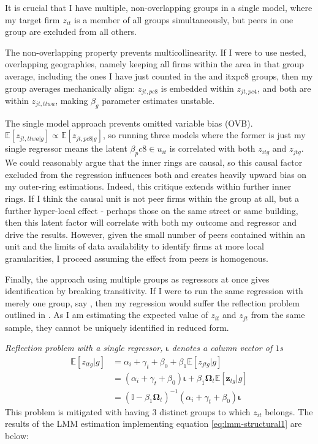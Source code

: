 It is crucial that I have multiple, non-overlapping groups in a single model,
where my target firm $z_{it}$ is a member of all groups simultaneously,
but peers in one group are excluded from all others.
\par
The non-overlapping property prevents multicollinearity.
If I were to use nested, overlapping geographies,
namely keeping all firms within the  area in that group average,
including the ones I have just counted in the  and itx{pc8} groups,
then my group averages mechanically align:
$z_{jt,pc8}$ is embedded within $z_{jt,pc4}$, and both are within $z_{jt,ttwa}$,
making $\beta_g$ parameter estimates unstable.
\par
The single model approach prevents omitted variable bias (OVB).
$\mathbb E[z_{jt,ttwa|g}] \propto  \mathbb E[z_{jt,pc8|g}]$,
so running three models where the former is just my single regressor means
the latent $\beta_pc8 \in u_{it}$ is correlated with both $z_{itg}$ and $z_{jtg}$.
We could reasonably argue that the inner rings are causal,
so this causal factor excluded from the regression influences both
and creates heavily upward bias on my outer-ring estimations.
Indeed, this critique extends within further inner rings.
If I think the causal unit is not peer firms within the  group at all,
but a further hyper-local effect - perhaps those on the same street or same building,
then this latent factor will correlate with both my outcome and regressor and drive the results.
However, given the small number of peers contained within an  unit and
the limits of data availability to identify firms at more local granularities,
I proceed assuming the effect from  peers is homogenous.
\par
Finally, the approach using multiple groups as regressors at once gives identification
by breaking transitivity.
If I were to run the same regression with merely one group, say ,
then my regression would suffer the reflection  problem outlined in \citep{Manski1993}.
As I am estimating the expected value of $z_{it}$ and $z_{jt}$ from the same sample,
they cannot be uniquely identified in reduced form.

\noindent\textit{Reflection problem with a single regressor, $\mathbf\iota$ denotes a column vector of $1$s}
\\
\begin{align*}
    \mathbb E[z_{itg}|g] &= \alpha_i + \gamma_t + \beta_0 + \beta_1 \mathbb{E}[z_{jtg}|g]
    \\
    &= (\alpha_i + \gamma_t + \beta_0)\mathbf\iota + \beta_1 \mathbf\Omega_t \mathbb E[\mathbf{z}_{tg}|g]
    \\
    &= (\mathbb I - \beta_1 \mathbf\Omega_t)^{-1} (\alpha_i + \gamma_t + \beta_0)\mathbf\iota
\end{align*}
%
This problem is mitigated with having 3 distinct groups to which $z_{it}$ belongs.
The results of the LMM estimation implementing equation \ref{eq:lmm-structural1} are below:
  
